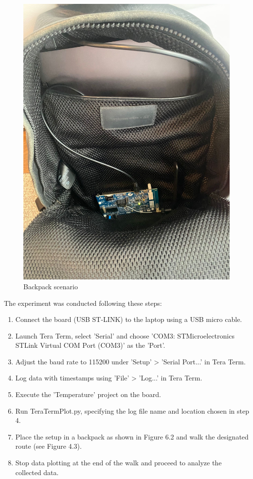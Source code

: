 \begin{figure}[H]
    \centering
    \includegraphics[width=0.5\linewidth]{Backpack_Experiment_1.jpeg}
    \caption{Backpack scenario}
    \label{fig:Backpack scenario}
\end{figure}

The experiment was conducted following these steps:

\begin{enumerate}
\item Connect the board (USB ST-LINK) to the laptop using a USB micro cable.
\item Launch Tera Term, select 'Serial' and choose 'COM3: STMicroelectronics STLink Virtual COM Port (COM3)' as the 'Port'.
\item Adjust the baud rate to 115200 under 'Setup' > 'Serial Port...' in Tera Term.
\item Log data with timestamps using 'File' > 'Log...' in Tera Term.
\item Execute the 'Temperature' project on the board.
\item Run TeraTermPlot.py, specifying the log file name and location chosen in step 4.
\item Place the setup in a backpack as shown in Figure 6.2 and walk the designated route (see Figure 4.3).
\item Stop data plotting at the end of the walk and proceed to analyze the collected data.
\end{enumerate}

